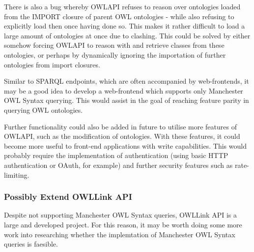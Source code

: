 \documentclass{article}
\begin{document}
There is also a bug whereby OWLAPI refuses to reason over ontologies loaded from
the IMPORT closure of parent OWL ontologies - while also refusing to explicitly
load then once having done so. This makes it rather difficult to load a large
amount of ontologies at once due to clashing. This could be solved by either
somehow forcing OWLAPI to reason with and retrieve classes from these
ontologies, or perhaps by dynamically ignoring the importation of further
ontologies from import closures.

Similar to SPARQL endpoints, which are often accompanied by web-frontends, it
may be a good idea to develop a web-frontend which supports only Manchester OWL
Syntax querying. This would assist in the goal of reaching feature parity in
querying OWL ontologies.

Further functionality could also be added in future to utilise more features of
OWLAPI, such as the modification of ontologies. With these features, it could
become more useful to front-end applications with write capabilities. This would
probably require the implementation of authentication (using basic HTTP
authentication or OAuth, for example) and further security features such as rate-limiting.

\subsubsection{Possibly Extend OWLLink API}

Despite not supporting Manchester OWL Syntax queries, OWLLink API is a large and
developed project. For this reason, it may be worth doing some
more work into researching whether the implemtation of Manchester OWL Syntax
queries is faesible.
\end{document}
